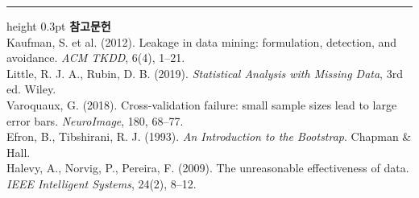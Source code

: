\documentclass[10pt]{article}
\begin{document}
\vspace{0.6em}
\hrule height 0.3pt
\vspace{0.5em}
{\footnotesize
\textbf{참고문헌}\\[0.3em]
Kaufman, S. et al. (2012). Leakage in data mining: formulation, detection, and
avoidance. \emph{ACM TKDD}, 6(4), 1--21.\\[0.15em]
Little, R. J. A., Rubin, D. B. (2019). \emph{Statistical Analysis with Missing
Data}, 3rd ed. Wiley.\\[0.15em]
Varoquaux, G. (2018). Cross-validation failure: small sample sizes lead to large
error bars. \emph{NeuroImage}, 180, 68--77.\\[0.15em]
Efron, B., Tibshirani, R. J. (1993). \emph{An Introduction to the Bootstrap}.
Chapman \& Hall.\\[0.15em]
Halevy, A., Norvig, P., Pereira, F. (2009). The unreasonable effectiveness of
data. \emph{IEEE Intelligent Systems}, 24(2), 8--12.
}
\end{document}
